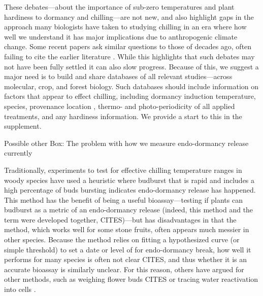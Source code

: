 \documentclass[11pt]{article}
\begin{document}
These debates---about the importance of sub-zero temperatures and plant hardiness to dormancy and chilling---are not new, and also highlight gaps in the approach many biologists have taken to studying chilling in an era where how well we understand it has major implications due to anthropogenic climate change. Some recent papers  ask similar questions to those of decades ago, often failing to cite the earlier literature \citep[e.g.,][]{lamb1948effect,Man:2010aa,baum2021}. While this highlights that such debates may not have been fully settled it can also slow progress. Because of this, we suggest a major need is to build and share databases of all relevant studies---across molecular, crop, and forest biology. Such databases should include information on factors that appear to effect chilling, including dormancy induction temperature, species, provenance location  \citep[as different populations may need different chilling][]{campbell1979,leinonen1996dependence}, thermo- and photo-periodicity of all applied treatments, and any hardiness information. We provide a start to this in the supplement. %


\vspace{5ex}
{\sc Possible other Box: The problem with how we measure endo-dormancy release currently} %

 Traditionally, experiments to test for effective chilling temperature ranges in woody species have used a heuristic where budburst that is rapid and includes a high percentage of buds bursting indicates endo-dormancy release has happened. This method has the benefit of being a useful bioassay---testing if plants can budburst as a metric of an endo-dormancy release (indeed, this method and the term were developed together, CITES)---but has disadvantages in that the method, which works well for some stone fruits, often appears much messier in other species. Because the method relies on fitting a hypothesized curve (or simple threshold) to set a date or level of for endo-dormancy break, how well it performs for many species is often not clear CITES, and thus whether it is an accurate bioassay is similarly unclear. For this reason, others have argued for other methods, such as weighing flower buds \citep{chuine2016}CITES or tracing water reactivation into cells \citep{faust1991bound,Kalcsits2009}. 
\end{document}
